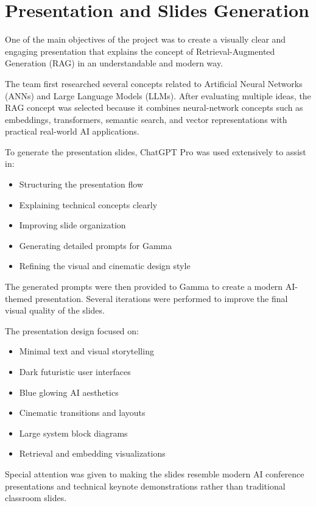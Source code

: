 \documentclass[12pt,a4paper]{article}
\begin{document}
\section{Presentation and Slides Generation}

One of the main objectives of the project was to create a visually clear and engaging presentation that explains the concept of Retrieval-Augmented Generation (RAG) in an understandable and modern way.

The team first researched several concepts related to Artificial Neural Networks (ANNs) and Large Language Models (LLMs). After evaluating multiple ideas, the RAG concept was selected because it combines neural-network concepts such as embeddings, transformers, semantic search, and vector representations with practical real-world AI applications.

To generate the presentation slides, ChatGPT Pro was used extensively to assist in:
\begin{itemize}
    \item Structuring the presentation flow
    \item Explaining technical concepts clearly
    \item Improving slide organization
    \item Generating detailed prompts for Gamma
    \item Refining the visual and cinematic design style
\end{itemize}

The generated prompts were then provided to Gamma to create a modern AI-themed presentation. Several iterations were performed to improve the final visual quality of the slides.

The presentation design focused on:
\begin{itemize}
    \item Minimal text and visual storytelling
    \item Dark futuristic user interfaces
    \item Blue glowing AI aesthetics
    \item Cinematic transitions and layouts
    \item Large system block diagrams
    \item Retrieval and embedding visualizations
\end{itemize}

Special attention was given to making the slides resemble modern AI conference presentations and technical keynote demonstrations rather than traditional classroom slides.
\end{document}
